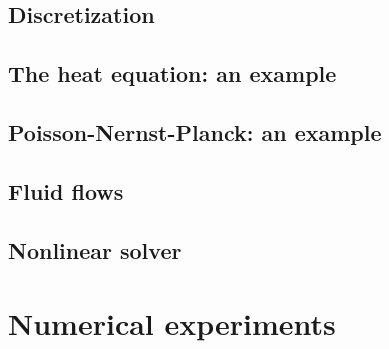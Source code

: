 \documentclass[final,10pt]{article}
\begin{document}
\subsection{Discretization}
\subsection{The heat equation: an example}
\subsection{Poisson-Nernst-Planck: an example}
\subsection{Fluid flows}
\subsection{Nonlinear solver}


\section{Numerical experiments}
\end{document}
